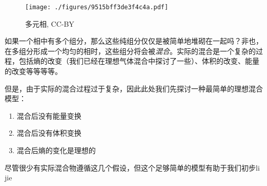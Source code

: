 
\begin{figure}[ht]
\centering
\texttt{[image: ./figures/9515bff3de3f4c4a.pdf]}
\caption{多元相, CC-BY} \label{fig_IMCPTV_1}
\end{figure}

如果一个相中有多个组分，那么这些纯组分仅仅是被简单地堆砌在一起吗？非也，在多组分形成一个均匀的相时，这些组分将会被\textsl{混合}。实际的混合是一个复杂的过程，包括熵的改变（我们已经在理想气体混合中探讨了一些）、体积的改变、能量的改变等等等等。

但是，由于实际的混合过程过于复杂，因此此处我们先探讨一种最简单的理想混合模型：
\begin{enumerate}
\item 混合后没有能量变换
\item 混合后没有体积变换
\item 混合后熵的变化是理想的
\end{enumerate}
尽管很少有实际混合物遵循这几个假设，但这个足够简单的模型有助于我们初步li jie